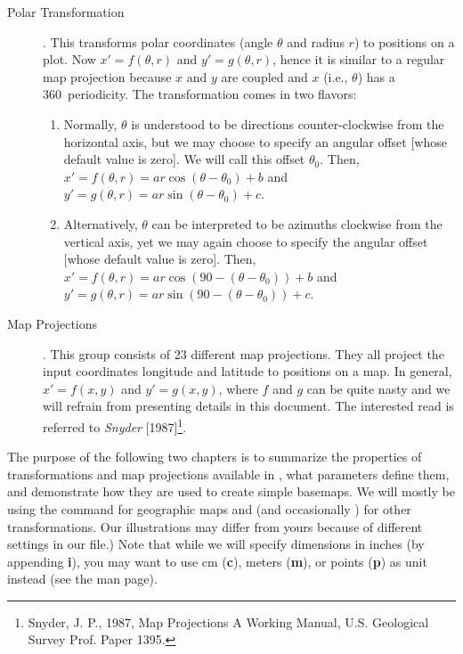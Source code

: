 \begin{description}
\item [Polar Transformation]. This transforms polar coordinates (angle $\theta$ and radius $r$)
to positions on a plot.  Now $x' = f(\theta,r)$ and $y' = g(\theta,r)$, hence it is similar
to a regular map projection because $x$ and $y$ are coupled and $x$ (i.e., $\theta$) has a 360\DS\ periodicity.
The transformation comes in two flavors:

\begin{enumerate}
\item Normally, $\theta$ is understood to be directions counter-clockwise from the horizontal axis, but we may choose
to specify an angular offset [whose default value is zero].  We will call this offset $\theta_0$.
Then, $x' = f(\theta, r) = ar \cos (\theta-\theta_0) + b$ and $y' = g(\theta, r) = ar \sin (\theta-\theta_0) + c$.
\item Alternatively, $\theta$ can be interpreted to be azimuths clockwise from the vertical axis, yet we may again
choose to specify the angular offset [whose default value is zero].
Then, $x' = f(\theta, r) = ar \cos (90 - (\theta-\theta_0)) + b$ and $y' = g(\theta, r) = ar \sin (90 - (\theta-\theta_0)) + c$.
\end{enumerate}

\item [Map Projections].  This group consists of 23 different map projections.  They all project the input coordinates
longitude and latitude to positions on a map.  In general, $x' = f(x,y)$ and $y' = g(x,y)$, where $f$ and $g$ can be
quite nasty and we will refrain from presenting details in this document.  The interested read is referred to
{\it Snyder} [1987]\footnote{Snyder, J. P., 1987, Map Projections \- A Working Manual, U.S. Geological Survey Prof. Paper 1395.}.
\end{description}

The purpose of the following two chapters is to summarize the properties
of transformations and map projections available in \GMT, what parameters define
them, and demonstrate how they are used to create simple
basemaps.  We will mostly be using the 
command for geographic maps and  (and occasionally ) for other transformations.
Our illustrations may differ from yours because of different settings in our
 file.)  Note that while we will
specify dimensions in inches (by appending {\bf i}), you may
want to use cm ({\bf c}), meters ({\bf m}), or points ({\bf p})
as unit instead (see the  man page). 
